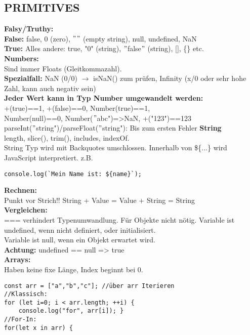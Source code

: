 \documentclass[7pt,landscape,a4paper]{scrartcl}
\begin{document}
\begin{multicols*}{4}
\subsection{PRIMITIVES}
	\textcolor{b}{\textbf{Falsy/Truthy:}}\\
	\textbf{False:} false, 0 (zero), $"$$"$ (empty string), null, undefined, NaN\\
	\textbf{True:} Alles andere: true, "0" (string), $"$false$"$ (string), [], \{\} etc.\\
	\textcolor{b}{\textbf{Numbers:}}\\
	Sind immer Floats (Gleitkommazahl).\\
	\textbf{Spezialfall:} NaN (0/0) $\rightarrow$ isNaN() zum prüfen, Infinity (x/0 oder sehr hohe Zahl, kann auch negativ sein)\\
	\textbf{Jeder Wert kann in Typ Number umgewandelt werden:}\\
	+(true)==1, +(false)==0, Number(true)==1,\\
	Number(null)==0, Number($"$abc")=>NaN, +("123")==123\\
	parseInt($"$string")/parseFloat($"$string"): Bis zum ersten Fehler 
	\textcolor{b}{\textbf{String}}\\
	length,	slice(), trim(), includes, indexOf.\\
	String Typ wird mit Backquotes umschlossen. Innerhalb von \$\{...\} wird JavaScript interpretiert. z.B.
\begin{lstlisting}[style=htmlcssjs]
console.log(`Mein Name ist: ${name}`);
\end{lstlisting}
	\textcolor{b}{\textbf{Rechnen:}}\\
	Punkt vor Strich!! String + Value = Value + String = String\\
	\textcolor{b}{\textbf{Vergleichen:}}\\
	=== verhindert Typenumwandlung. Für Objekte nicht nötig.
	Variable ist \textcolor{b}{undefined}, wenn nicht definiert, oder initialisiert.\\
	Variable ist \textcolor{b}{null}, wenn ein Objekt erwartet wird.\\
	\textbf{Achtung:} undefined == null => true\\
	\textcolor{b}{\textbf{Arrays:}}\\
	Haben keine fixe Länge, Index beginnt bei 0.
\begin{lstlisting}[style=htmlcssjs]
const arr = ["a","b","c"]; //über arr Iterieren
//Klassisch:
for (let i=0; i < arr.length; ++i) {
	console.log("for", arr[i]); }
//For-In:
for(let x in arr) {

\end{lstlisting}$$
\end{multicols*}
\end{document}
